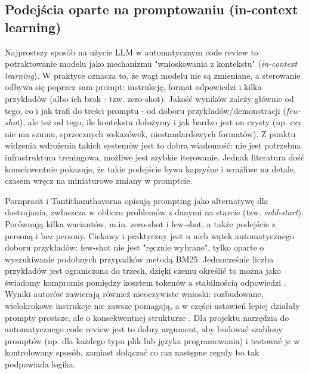 \subsection{Podejścia oparte na promptowaniu (in-context learning)}
\label{subsec:llm_acr_prompting}

Najprostszy sposób na użycie LLM w automatycznym code review to potraktowanie modelu jako mechanizmu
"wnioskowania z kontekstu" (\emph{in-context learning}). W praktyce oznacza to, że wagi modelu nie są zmieniane, a
sterowanie odbywa się poprzez sam prompt: instrukcję, format odpowiedzi i kilka przykładów (albo ich brak - tzw. zero-shot).
Jakość wyników zależy głównie od tego, co i jak trafi do treści promptu - od doboru przykładów/demonstracji (\emph{few-shot}),
ale też od tego, ile kontekstu dołożymy i jak bardzo jest on czysty (np. czy nie ma szumu, sprzecznych wskazówek, niestandardowych 
formatów). Z punktu widzenia wdrożenia takich systemów jest to dobra wiadomość: nie jest potrzebna infrastruktura treningowa, 
możliwe jest szybkie iterowanie. Jednak literatura dość konsekwentnie pokazuje, że takie 
podejście bywa kapryśne i wrażliwe na detale, czasem wręcz na miniaturowe zmiany w promptcie.

Pornprasit i Tantithamthavorna opisują prompting jako alternatywę dla dostrajania, zwłaszcza w obliczu
problemów z danymi na starcie (tzw. \emph{cold-start}). Porównują kilka wariantów, m.in. zero-shot 
i few-shot, a także podejście z personą i bez persony. Ciekawy i praktyczny jest u nich wątek automatycznego doboru
przykładów: few-shot nie jest "ręcznie wybrane", tylko oparte o wyszukiwanie podobnych przypadków metodą BM25.
Jednocześnie liczba przykładów jest ograniczona do trzech, dzięki czemu określić to można jako świadomy kompromis
pomiędzy kosztem tokenów a stabilnością odpowiedzi \cite{Pornprasit2024FineTuningPromptingCR}. Wyniki autorów
zawierają również nieoczywiste wnioski: rozbudowane, wielokrokowe instrukcje nie zawsze pomagają, a w części ustawień lepiej 
działały prompty prostsze, ale o konsekwentnej strukturze \cite{Pornprasit2024FineTuningPromptingCR}. Dla projektu
narzędzia do automatycznego code review jest to dobry argument, aby budować szablony promptów
(np. dla każdego typu plik lub języka programowania) i testować je w kontrolowany sposób, zamiast dołączać co raz następne reguły
bo tak podpowiada logika.

